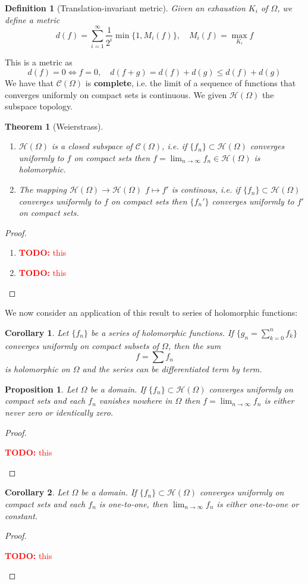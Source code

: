 \documentclass{article}
\newtheorem{theorem}{Theorem}
\newtheorem{corollary}{Corollary}
\newcommand{\mc}[1]{\mathcal{#1}}
\newtheorem{definition}{Definition}
\newtheorem{proposition}{Proposition}
\newcommand{\TODO}[1]{\begin{center}\huge{\textcolor{red}{\textbf{TODO:} #1}}\end{center}}
\begin{document}
\begin{definition}[Translation-invariant metric]
Given an exhaustion \(K_i\) of \(\Omega\), we define a metric
\[d(f) = \sum_{i = 1}^\infty\frac{1}{2^i}\min\{1, M_i(f)\}, \quad M_i(f) = \max_{K_i}f\]
\end{definition}
This is a metric as
\[d(f) = 0 \iff f = 0, \quad d(f + g) = d(f) + d(g) \leq d(f) + d(g)\]
We have that \(\mc{C}(\Omega)\) is \textbf{complete}, i.e. the limit of a sequence of functions that converges uniformly on compact sets is continuous. We given \(\mc{H}(\Omega)\) the subspace topology.
\begin{theorem}[Weierstrass]
\begin{enumerate}
  \item \(\mc{H}(\Omega)\) is a closed subspace of \(\mc{C}(\Omega)\), i.e. if \(\{f_n\} \subset \mc{H}(\Omega)\) converges uniformly to \(f\) on compact sets then \(f = \lim_{n \to \infty}f_n \in \mc{H}(\Omega)\) is holomorphic.
  \item The mapping \(\mc{H}(\Omega) \to \mc{H}(\Omega)\) \(f \mapsto f'\) is continous, i.e. if \(\{f_n\} \subset \mc{H}(\Omega)\) converges uniformly to \(f\) on compact sets then \(\{f_n'\}\) converges uniformly to \(f'\) on compact sets.
\end{enumerate}
\end{theorem}
\begin{proof}
\begin{enumerate}

  \item \TODO{this}

  \item \TODO{this}

\end{enumerate}
\end{proof}

We now consider an application of this result to series of holomorphic functions:
\begin{corollary}
Let \(\{f_n\}\) be a series of holomorphic functions. If \(\{g_n = \sum_{k = 0}^nf_k\}\) converges uniformly on compact subsets of \(\Omega\), then the sum
\[f = \sum f_n\]
is holomorphic on \(\Omega\) and the series can be differentiated term by term.
\end{corollary}
\begin{proposition}
Let \(\Omega\) be a domain. If \(\{f_n\} \subset \mc{H}(\Omega)\) converges uniformly on compact sets and each \(f_n\) vanishes nowhere in \(\Omega\) then \(f = \lim_{n \to \infty}f_n\) is either never zero or identically zero.
\end{proposition}
\begin{proof}
\TODO{this}
\end{proof}
\begin{corollary}
Let \(\Omega\) be a domain. If \(\{f_n\} \subset \mc{H}(\Omega)\) converges uniformly on compact sets and each \(f_n\) is one-to-one, then \(\lim_{n \to \infty}f_n\) is either one-to-one or constant.
\end{corollary}
\begin{proof}
\TODO{this}
\end{proof}
\end{document}
